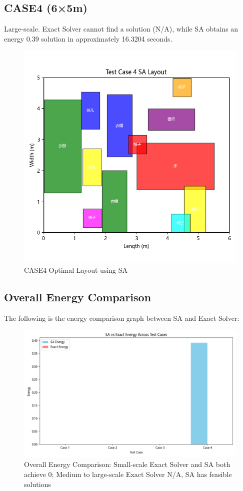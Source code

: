 \documentclass[conference]{IEEEtran}
\begin{document}
\FloatBarrier %

\subsection{CASE4 (6×5m)}
Large-scale. Exact Solver cannot find a solution (N/A), while SA obtains an energy 0.39 solution in approximately 16.3204 seconds.

\begin{figure}[!htbp]
    \centering
    \includegraphics[width=0.8\columnwidth]{sa_layout_test_case_4.png} 
    \caption{CASE4 Optimal Layout using SA}
    \label{fig:case4_sa}
\end{figure}

\FloatBarrier %

\subsection{Overall Energy Comparison}
The following is the energy comparison graph between SA and Exact Solver:

\begin{figure}[!htbp]
    \centering
    \includegraphics[width=0.8\columnwidth]{energy_comparison.png} 
    \caption{Overall Energy Comparison: Small-scale Exact Solver and SA both achieve 0; Medium to large-scale Exact Solver N/A, SA has feasible solutions}
    \label{fig:energy_comparison}
\end{figure}
\end{document}
